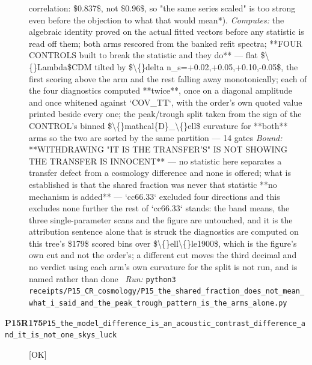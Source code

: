 \begin{description}
correlation: \$0.837\$, not \$0.96\$, so "the same series scaled" is too strong even before the objection to what that would mean*). 
\emph{Computes:} the algebraic identity proved on the actual fitted vectors before any statistic is read off them; both arms rescored from the banked refit spectra; **FOUR CONTROLS built to break the statistic and they do** --- flat \$\textbackslash\{\}Lambda\$CDM tilted by \$\textbackslash\{\}delta n\_s=+0.02,+0.05,+0.10,-0.05\$, the first scoring above the arm and the rest falling away monotonically; each of the four diagnostics computed **twice**, once on a diagonal amplitude and once whitened against `COV\_TT`, with the order's own quoted value printed beside every one; the peak/trough split taken from the sign of the CONTROL's binned \$\textbackslash\{\}mathcal\{D\}\_\textbackslash\{\}ell\$ curvature for **both** arms so the two are sorted by the same partition --- 14 gates
 \emph{Bound:}   **WITHDRAWING "IT IS THE TRANSFER'S" IS NOT SHOWING THE TRANSFER IS INNOCENT** --- no statistic here separates a transfer defect from a cosmology difference and none is offered; what is established is that the shared fraction was never that statistic  **no mechanism is added** --- `cc66.33` excluded four directions and this excludes none further  the rest of `cc66.33` stands: the band means, the three single-parameter scans and the figure are untouched, and it is the attribution sentence alone that is struck  the diagnostics are computed on this tree's \$179\$ scored bins over \$\textbackslash\{\}ell\textbackslash\{\}le1900\$, which is the figure's own cut and not the order's; a different cut moves the third decimal and no verdict  using each arm's own curvature for the split is not run, and is named rather than done
\ \emph{Run:} \texttt{python3 receipts/P15\_CR\_cosmology/P15\_the\_shared\_fraction\_does\_not\_mean\_what\_i\_said\_and\_the\_peak\_trough\_pattern\_is\_the\_arms\_alone.py}
\item[\rcptlabel{P15_the_model_difference_is_an_acoustic_contrast_difference_and_it_is_not_one_skys_luck}{P15R175}\textbf{P15R175}\quad\texttt{P15\_the\_model\_difference\_is\_an\_acoustic\_contrast\_difference\_and\_it\_is\_not\_one\_skys\_luck}]\hfill\textsf{[OK]}\\

\end{description}
